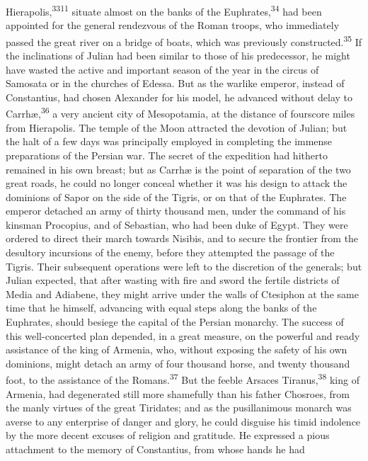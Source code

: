 Hierapolis,\textsuperscript{3311} situate almost on the banks of the Euphrates,\textsuperscript{34}
had been appointed for the general rendezvous of the Roman
troops, who immediately passed the great river on a bridge of
boats, which was previously constructed.\textsuperscript{35} If the inclinations
of Julian had been similar to those of his predecessor, he might
have wasted the active and important season of the year in the
circus of Samosata or in the churches of Edessa. But as the
warlike emperor, instead of Constantius, had chosen Alexander for
his model, he advanced without delay to Carrhæ,\textsuperscript{36} a very ancient
city of Mesopotamia, at the distance of fourscore miles from
Hierapolis. The temple of the Moon attracted the devotion of
Julian; but the halt of a few days was principally employed in
completing the immense preparations of the Persian war. The
secret of the expedition had hitherto remained in his own breast;
but as Carrhæ is the point of separation of the two great roads,
he could no longer conceal whether it was his design to attack
the dominions of Sapor on the side of the Tigris, or on that of
the Euphrates. The emperor detached an army of thirty thousand
men, under the command of his kinsman Procopius, and of
Sebastian, who had been duke of Egypt. They were ordered to
direct their march towards Nisibis, and to secure the frontier
from the desultory incursions of the enemy, before they attempted
the passage of the Tigris. Their subsequent operations were left
to the discretion of the generals; but Julian expected, that
after wasting with fire and sword the fertile districts of Media
and Adiabene, they might arrive under the walls of Ctesiphon at
the same time that he himself, advancing with equal steps along
the banks of the Euphrates, should besiege the capital of the
Persian monarchy. The success of this well-concerted plan
depended, in a great measure, on the powerful and ready
assistance of the king of Armenia, who, without exposing the
safety of his own dominions, might detach an army of four
thousand horse, and twenty thousand foot, to the assistance of
the Romans.\textsuperscript{37} But the feeble Arsaces Tiranus,\textsuperscript{38} king of
Armenia, had degenerated still more shamefully than his father
Chosroes, from the manly virtues of the great Tiridates; and as
the pusillanimous monarch was averse to any enterprise of danger
and glory, he could disguise his timid indolence by the more
decent excuses of religion and gratitude. He expressed a pious
attachment to the memory of Constantius, from whose hands he had
